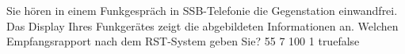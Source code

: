     {Sie hören in einem Funkgespräch in SSB-Telefonie die Gegenstation einwandfrei. Das Display Ihres Funkgerätes zeigt die abgebildeten Informationen an. Welchen Empfangsrapport nach dem RST-System geben Sie?}
    {55}
    {7}
    {100}
    {1}
    {true}{false}